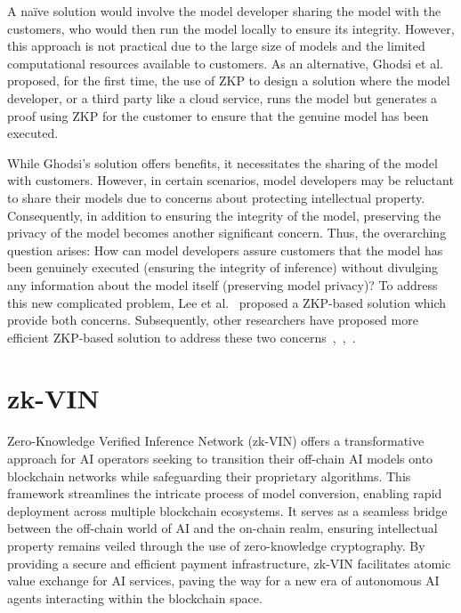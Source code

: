 \documentclass[conference]{IEEEtran}
\begin{document}
A naïve solution would involve the model developer sharing the model with the customers, who would then run the model locally to ensure its integrity. However, this approach is not practical due to the large size of models and the limited computational resources available to customers. As an alternative, Ghodsi et al.~\cite{Ghodsi2017SafetyNetsVE} proposed, for the first time, the use of ZKP to design a solution where the model developer, or a third party like a cloud service, runs the model but generates a proof using ZKP for the customer to ensure that the genuine model has been executed.

While Ghodsi's solution offers benefits, it necessitates the sharing of the model with customers. However, in certain scenarios, model developers may be reluctant to share their models due to concerns about protecting intellectual property. Consequently, in addition to ensuring the integrity of the model, preserving the privacy of the model becomes another significant concern. Thus, the overarching question arises: How can model developers assure customers that the model has been genuinely executed (ensuring the integrity of inference) without divulging any information about the model itself (preserving model privacy)? To address this new complicated problem, Lee et al.~\cite{Lee2020vCNNVC} proposed a ZKP-based solution which provide both concerns. Subsequently, other researchers have proposed more efficient ZKP-based solution to address these two concerns~\cite{Liu2021zkCNNZK},~\cite{Feng2021ZENAO},~\cite{Ju2021EfficientSP}.




\section{zk-VIN}

Zero-Knowledge Verified Inference Network (zk-VIN) offers a transformative approach for AI operators seeking to transition their off-chain AI models onto blockchain networks while safeguarding their proprietary algorithms. This framework streamlines the intricate process of model conversion, enabling rapid deployment across multiple blockchain ecosystems. It serves as a seamless bridge between the off-chain world of AI and the on-chain realm, ensuring intellectual property remains veiled through the use of zero-knowledge cryptography. By providing a secure and efficient payment infrastructure, zk-VIN facilitates atomic value exchange for AI services, paving the way for a new era of autonomous AI agents interacting within the blockchain space.
\end{document}
